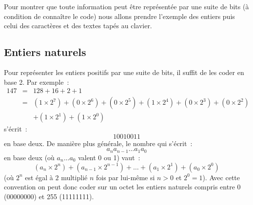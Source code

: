Pour montrer que toute information peut être représentée par une suite de bits (à condition
de connaître le code) nous allons prendre l'exemple des entiers puis celui des caractères et 
des textes tapés au clavier.

\subsection{Entiers naturels}

Pour représenter les entiers positifs par une suite de bits, il suffit de les coder en base
2. Par exemple~:
\[\begin{array}{lll}
147 & = &128 +  16 + 2 + 1 \\
       & = & (1 \times 2^{7}) + (0 \times 2^{6}) + (0 \times 2^{5}) + (1 \times 2^{4}) + (0 \times 2^{3}) + (0 \times 2^{2}) \\
       &    & + (1 \times 2^{1}) + (1 \times 2^{0})
\end{array}\]
s'écrit~: \[10010011\] en base deux. De manière plus générale, le
 nombre qui s'écrit~: \[a_{n}a_{n-1} \ldots a_{1}a_{0}\]
 en base deux (où $a_{n} \ldots a_{0}$ valent 0 ou 1)
 vaut~:
\[(a_{n} \times 2^{n}) + (a_{n-1} \times 2^{n-1}) + \ldots 
+ (a_{1} \times 2^{1}) + (a_{0} \times 2^{0})\]
(où $2^{n}$ est égal à $2$ multiplié $n$ fois par lui-même si $n>0$ et $2^{0} = 1$).
Avec cette convention on peut donc coder
 sur un octet les entiers naturels compris entre 0 (00000000) et 255 (11111111).

